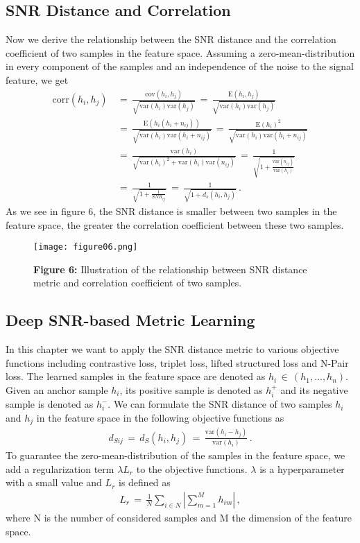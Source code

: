 \documentclass[12pt,paper=a4]{scrartcl}
\theoremstyle{break}
\begin{document}
\subsection{SNR Distance and Correlation}
Now we derive the relationship between the SNR distance and the correlation coefficient of two samples in the feature space. Assuming a zero-mean-distribution in every component of the samples and an independence of the noise to the signal feature, we get
\begin{align}
\mathrm{corr}(h_i,h_j)\,&=\,\frac{\mathrm{cov}(h_i,h_j)}{\sqrt{\mathrm{var}(h_i)\mathrm{var}(h_j)}}\,=\,\frac{\mathrm{E}(h_i,h_j)}{\sqrt{\mathrm{var}(h_i)\mathrm{var}(h_j)}} \\
&=\,\frac{\mathrm{E}\left( h_i\left( h_i+n_{ij}\right) \right)}{\sqrt{\mathrm{var}(h_i)\mathrm{var}(h_i+n_{ij})}}\,=\,\frac{\mathrm{E}(h_i)^2}{\sqrt{\mathrm{var}(h_i)\mathrm{var}(h_i+n_{ij})}} \\
&= \,\frac{\mathrm{var}(h_i)}{\sqrt{\mathrm{var}(h_i)^2+\mathrm{var}(h_i)\mathrm{var}(n_{ij})}}\, =\,\frac{1}{\sqrt{1+\frac{\mathrm{var}(n_{ij})}{\mathrm{var}(h_i)}}} \\
&=\,\frac{1}{\sqrt{1+\frac{1}{SNR_{ij}}}}\,=\,\frac{1}{\sqrt{1+d_s(h_i,h_j)}}\, .
\end{align}
As we see in figure 6, the SNR distance is smaller between two samples in the feature space, the greater the correlation coefficient between these two samples.
\begin{figure}[h]
	\centering
  \texttt{[image: figure06.png]}
  \caption{\textbf{Figure 6:} Illustration of the relationship between SNR distance metric and correlation coefficient of two samples.}
\end{figure}
\subsection{Deep SNR-based Metric Learning}
In this chapter we want to apply the SNR distance metric to various objective functions including contrastive loss, triplet loss, lifted structured loss and N-Pair loss. The learned samples in the feature space are denoted as $h_i\,\in\,(h_1,...,h_n)$. Given an anchor sample $h_i$, its positive sample is denoted as $h_i^+$ and its negative sample is denoted as $h_i^-$. We can formulate the SNR distance of two samples $h_i$ and $h_j$ in the feature space in the following objective functions as
\begin{align}
d_{Sij}\,=\, d_S(h_i,h_j)\,=\,\frac{\mathrm{var}(h_i-h_j)}{\mathrm{var}(h_i)}\, .
\end{align}
To guarantee the zero-mean-distribution of the samples in the feature space, we add a regularization term $\lambda L_r$ to the objective functions. $\lambda$ is a hyperparameter with a small value and $L_r$ is defined as
\begin{align}
L_r\,=\,\frac{1}{N}\sum_{i\in N}|\sum_{m=1}^Mh_{im}|\, ,
\end{align}
where N is the number of considered samples and M the dimension of the feature space.
\end{document}
